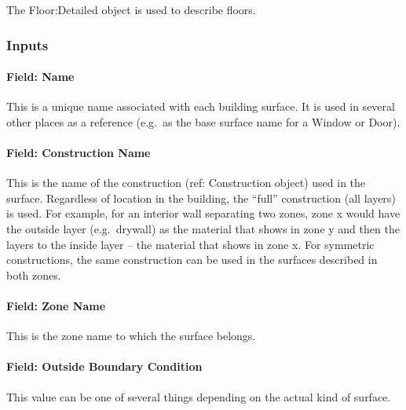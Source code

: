 The Floor:Detailed object is used to describe floors.

\subsubsection{Inputs}\label{inputs-22-006}

\paragraph{Field: Name}\label{field-name-18-008}

This is a unique name associated with each building surface. It is used in several other places as a reference (e.g.~as the base surface name for a Window or Door).

\paragraph{Field: Construction Name}\label{field-construction-name-18}

This is the name of the construction (ref: Construction object) used in the surface. Regardless of location in the building, the ``full'' construction (all layers) is used. For example, for an interior wall separating two zones, zone x would have the outside layer (e.g.~drywall) as the material that shows in zone y and then the layers to the inside layer -- the material that shows in zone x. For symmetric constructions, the same construction can be used in the surfaces described in both zones.

\paragraph{Field: Zone Name}\label{field-zone-name-12-000}

This is the zone name to which the surface belongs.

\paragraph{Field: Outside Boundary Condition}\label{field-outside-boundary-condition-2}

This value can be one of several things depending on the actual kind of surface.

